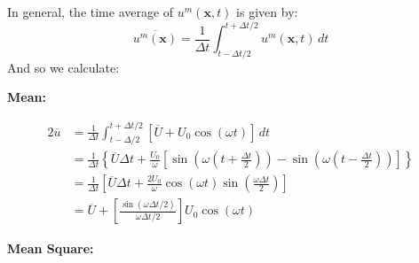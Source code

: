 \documentclass[a4paper]{article}
\begin{document}
\vspace{12pt}


In general, the time average of \(u^{m} \!\left( \bm{x}, t \right) \) is given by:
\[
	\overline{u^{m} \!\left( \bm{x} \right)} = \frac{1}{\Delta t} \int^{t + \Delta t / 2}_{t - \Delta t / 2} u^{m}\!\left( \bm{x}, t \right)  \, dt 
\]
And so we calculate:

\textbf{Mean:}

\begin{alignat*}{2}
	\overline{u} & = \frac{1}{\Delta t} \int^{t + \Delta t / 2}_{t - \Delta / 2} \!\left[ \overline{U} + U_{0} \cos\left( \omega t \right) \right] \, dt  \\
		     & = \frac{1}{\Delta t} \left\{ \overline{U} \Delta t + \frac{U_{0}}{\omega} \left[
    \sin\left( \omega \left( t + \frac{\Delta t}{2} \right) \right)
    - \sin\left( \omega \left( t - \frac{\Delta t}{2} \right) \right) \right] \right\} \\
    		     & = \frac{1}{\Delta t} \!\left[ \overline{U} \Delta t + \frac{2 U_{0}}{\omega} \cos\left( \omega t \right) \sin\left( \frac{\omega \Delta t}{2} \right) \right] \\
		     & = \boxed{ \overline{U} + \!\left[ \frac{\sin\left( \omega \Delta t / 2 \right)}{\omega \Delta t / 2} \right] U_{0} \cos\left( \omega t \right) }
\end{alignat*}

\textbf{Mean Square:}
\end{document}
